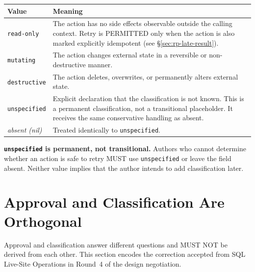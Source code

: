 \begin{center}
\begin{tabular}{lp{9.5cm}}
\toprule
\textbf{Value} & \textbf{Meaning} \\
\midrule
\texttt{read-only}    & The action has no side effects observable outside the
                         calling context.  Retry is PERMITTED only when the
                         action is also marked explicitly idempotent
                         (see \S\ref{sec:rp-late-result}). \\
\texttt{mutating}     & The action changes external state in a reversible or
                         non-destructive manner. \\
\texttt{destructive}  & The action deletes, overwrites, or permanently alters
                         external state. \\
\texttt{unspecified}  & Explicit declaration that the classification is not
                         known.  This is a permanent classification, not a
                         transitional placeholder.  It receives the same
                         conservative handling as absent. \\
\midrule
\emph{absent (nil)}   & Treated identically to \texttt{unspecified}. \\
\bottomrule
\end{tabular}
\end{center}

\noindent \textbf{\texttt{unspecified} is permanent, not transitional.}  Authors
who cannot determine whether an action is safe to retry MUST use
\texttt{unspecified} or leave the field absent.  Neither value implies that the
author intends to add classification later.

\section{Approval and Classification Are Orthogonal}
\label{sec:rp-approval-classification}

\begin{tcolorbox}[colback=red!5, colframe=red!50, title=Most Important Section]
  Approval and classification answer different questions and MUST NOT be derived
  from each other.  This section encodes the correction accepted from SQL
  Live-Site Operations in Round~4 of the design negotiation.
\end{tcolorbox}

